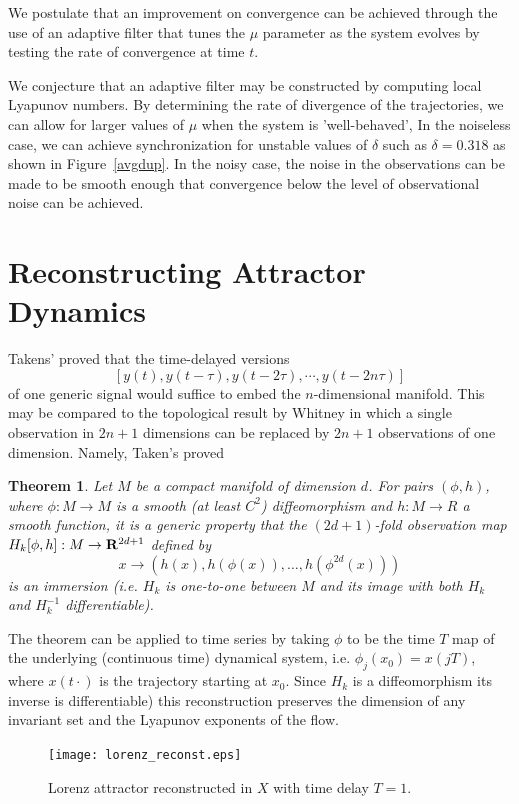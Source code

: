 \documentclass[master,tocprelim,12pt]{unrthesis}
\newtheorem{theorem}{Theorem}[chapter]
\theoremstyle{definition}
\newcommand{\R}{{\bf R}}
\numberwithin{equation}{chapter}
\begin{document}
\begin{manuscript}
We postulate that an improvement on convergence can be achieved through the use
of an adaptive filter that tunes the $\mu$ parameter as the system evolves by
testing the rate of convergence at time $t$.

We conjecture that an adaptive filter may be constructed by computing local
Lyapunov numbers. By determining the rate of divergence of the trajectories, we can allow 
for larger values of $\mu$ when the system is 'well-behaved', 
In the noiseless case, we can achieve synchronization for unstable values of
$\delta$ such as $\delta = 0.318$ as shown in Figure~\ref{avgdup}.
In the noisy case, the noise in the observations can be made
to be smooth enough that convergence below the level of observational noise can be achieved. 

\section{Reconstructing Attractor Dynamics}

Takens' \cite{Takens81} proved that the time-delayed 
versions 
$$
[y(t),y(t-\tau),y(t-2\tau),\cdots,y(t-2n\tau)]
$$ 
of one generic signal would suffice 
to embed the $n$-dimensional manifold. 
This may be compared to the topological result
by Whitney \cite{Whitney36} in which a single observation
in $2n+1$ dimensions can be replaced by $2n+1$ observations
of one dimension.  Namely, Taken's proved

\begin{theorem} Let $M$ be a compact manifold of dimension $d$. 
For pairs $(\phi, h)$,
where $\phi : M \to M$ is a smooth (at least $C^2$) diffeomorphism and 
$h : M \to R$ a smooth
function, it is a generic property that the $(2d +1)$-fold observation map
$H_k[\phi, h] : M \to \R^{2d+1}$
defined by
$$
x \to (h(x), h(\phi(x)), \ldots, h(\phi^{2d} (x)))
$$
is an immersion (i.e. $H_k$ is one-to-one between $M$ and its image with both 
$H_k$ and $H^{-1}_k$ differentiable).
\end{theorem}
The theorem can be applied to time series by taking $\phi$ to be the time $T$ map of
the underlying
(continuous time) dynamical system, i.e. $\phi_j (x_0) = x(jT)$, 
where $x(t·)$ is the
trajectory starting
at $x_0$. 
Since $H_k$ is a diffeomorphism 
its inverse is differentiable) this reconstruction
preserves the
dimension of any invariant set and the Lyapunov exponents of the flow.
\begin{figure}[ht]\label{reconst}
\begin{center}
\caption{Lorenz attractor reconstructed in $X$ with time delay $T = 1$.}
\texttt{[image: lorenz\_reconst.eps]}
\end{center}\end{figure}


\end{manuscript}
\end{document}
